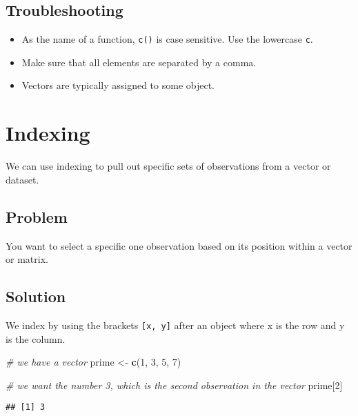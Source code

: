 \documentclass[]{book}
\newenvironment{Shaded}{\begin{snugshade}}{\end{snugshade}}
\newcommand{\KeywordTok}[1]{\textcolor[rgb]{0.13,0.29,0.53}{\textbf{{#1}}}}
\newcommand{\DecValTok}[1]{\textcolor[rgb]{0.00,0.00,0.81}{{#1}}}
\newcommand{\StringTok}[1]{\textcolor[rgb]{0.31,0.60,0.02}{{#1}}}
\newcommand{\CommentTok}[1]{\textcolor[rgb]{0.56,0.35,0.01}{\textit{{#1}}}}
\newcommand{\NormalTok}[1]{{#1}}
\providecommand{\tightlist}{%
  \setlength{\itemsep}{0pt}\setlength{\parskip}{0pt}}
\begin{document}
\subsection{Troubleshooting}\label{troubleshooting-2}

\begin{itemize}
\tightlist
\item
  As the name of a function, \texttt{c()} is case sensitive. Use the
  lowercase \texttt{c}.
\item
  Make sure that all elements are separated by a comma.
\item
  Vectors are typically assigned to some object.
\end{itemize}

\section{Indexing}\label{indexing}

We can use indexing to pull out specific sets of observations from a
vector or dataset.

\subsection{Problem}\label{problem-3}

You want to select a specific one observation based on its position
within a vector or matrix.

\subsection{Solution}\label{solution-3}

We index by using the brackets \texttt{{[}x,\ y{]}} after an object
where x is the row and y is the column.

\begin{Shaded}
\begin{Highlighting}[]
\CommentTok{# we have a vector}
\NormalTok{prime <-}\StringTok{ }\KeywordTok{c}\NormalTok{(}\DecValTok{1}\NormalTok{, }\DecValTok{3}\NormalTok{, }\DecValTok{5}\NormalTok{, }\DecValTok{7}\NormalTok{)}

\CommentTok{# we want the number 3, which is the second observation in the vector}
\NormalTok{prime[}\DecValTok{2}\NormalTok{]}
\end{Highlighting}
\end{Shaded}

\begin{verbatim}
## [1] 3
\end{verbatim}
\end{document}
